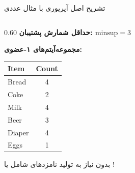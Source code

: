\begin{frame}{تشریح اصل آپریوری با مثال عددی}{}
\begin{columns}[T,onlytextwidth]
\begin{column}{0.60\textwidth}
\textbf{\footnotesize حداقل شمارش پشتیبان: $\text{minsup} = 3$}\\[3pt]
\begin{minipage}{0.46\linewidth}
\textbf{\scriptsize مجموعه‌آیتم‌های ۱-عضوی:}\\[1pt]
\begin{latin}
\fontsize{7}{8.5}\selectfont
\begin{tabular}{|l|c|}
\hline
\rowcolor{mannheimblue!15}\textbf{Item} & \textbf{Count} \\ \hline
Bread & 4 \\ \hline
\rowcolor{black!15}Coke & 2 \\ \hline
Milk & 4 \\ \hline
Beer & 3 \\ \hline
Diaper & 4 \\ \hline
\rowcolor{black!15}Eggs & 1 \\ \hline
\end{tabular}
\end{latin}
\end{minipage}\hfill
\begin{minipage}{0.50\linewidth}
\begin{tcolorbox}[colback=orange!10,colframe=orange!80!black,arc=2pt,left=2pt,right=2pt,top=2pt,bottom=2pt]
\centering
\scriptsize بدون نیاز به تولید نامزدهای شامل  یا !
\end{tcolorbox}
\end{minipage}


\end{column}
\end{columns}
\end{frame}
